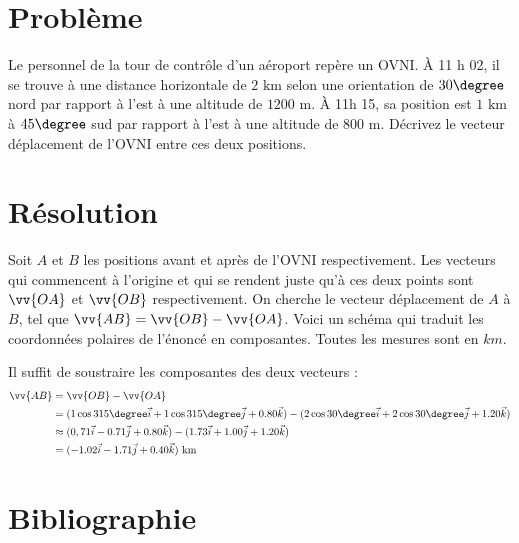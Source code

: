 \documentclass[11pt]{article}
\begin{document}
\section*{Problème}
Le personnel de la tour de contrôle d'un aéroport repère un OVNI. À 11 h 02, il se trouve à une distance horizontale de $2\text{ km}$ selon une orientation de $30\degree$ nord par rapport à l'est à une altitude de $1200\text{ m}$. À 11h 15, sa position est $1\text{ km}$ à $45\degree$ sud par rapport à l'est à une altitude de $800\text{ m}$. Décrivez le vecteur déplacement de l'OVNI entre ces deux positions.\cite{problem}

\section*{Résolution}
Soit $A$ et $B$ les positions avant et après de l'OVNI respectivement. Les vecteurs qui commencent à l'origine et qui se rendent juste qu'à ces deux points sont $\vv{OA}$ et $\vv{OB}$ respectivement. On cherche le vecteur déplacement de $A$ à $B$, tel que $\vv{AB}=\vv{OB}-\vv{OA}$. Voici un schéma qui traduit les coordonnées polaires de l'énoncé en composantes. Toutes les mesures sont en $km$.
\begin{center}

\end{center}
\pagebreak

Il suffit de soustraire les composantes des deux vecteurs :
\begin{equation*}
\begin{split}
\vv{AB}&=\vv{OB}-\vv{OA}\\
       &=(1\cos315\degree\vec{i}+1\cos315\degree\vec{j}+0.80\vec{k})-(2\cos30\degree\vec{i}+2\cos30\degree\vec{j}+1.20\vec{k})\\
       &\approx(0,71\vec{i}-0.71\vec{j}+0.80\vec{k})-(1.73\vec{i}+1.00\vec{j}+1.20\vec{k})\\
       &=(-1.02\vec{i}-1.71\vec{j}+0.40\vec{k})\text{ km}
\end{split}
\end{equation*}

\section*{Bibliographie}

\renewcommand{\section}[2]{}

\end{document}
